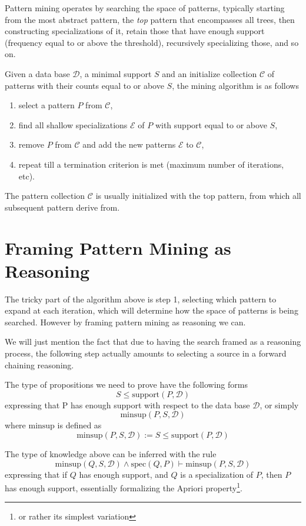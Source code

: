\documentclass[runningheads]{llncs}
\begin{document}
Pattern mining operates by searching the space of patterns, typically
starting from the most abstract pattern, the \emph{top} pattern that
encompasses all trees, then constructing specializations of it, retain
those that have enough support (frequency equal to or above the
threshold), recursively specializing those, and so on.

Given a data base $\mathcal{D}$, a minimal support $S$ and an initialize
collection $\mathcal{C}$ of patterns with their counts equal to or above $S$,
the mining algorithm is as follows
\begin{enumerate}
\item select a pattern $P$ from $\mathcal{C}$,
\item find all shallow specializations $\mathcal{E}$ of $P$ with
  support equal to or above $S$,
\item remove $P$ from $\mathcal{C}$ and add the new patterns
  $\mathcal{E}$ to $\mathcal{C}$,
\item repeat till a termination criterion is met (maximum number of
  iterations, etc).
\end{enumerate}

The pattern collection $\mathcal{C}$ is usually initialized with the
top pattern, from which all subsequent pattern derive from.

\section{Framing Pattern Mining as Reasoning}

The tricky part of the algorithm above is step 1, selecting which
pattern to expand at each iteration, which will determine how the
space of patterns is being searched. However by framing pattern mining
as reasoning we can.

We will just mention the fact that due to having the search framed as
a reasoning process, the following step actually amounts to selecting
a source in a forward chaining reasoning.

The type of propositions we need to prove have the following forms
$$ S \le \text{support}(P, \mathcal{D}) $$ expressing that P has
enough support with respect to the data base $\mathcal{D}$, or simply
$$ \text{minsup}(P, S, \mathcal{D}) $$ where $\text{minsup}$ is
defined as
$$ \text{minsup}(P, S, \mathcal{D}) := S \le \text{support}(P,
\mathcal{D}) $$

The type of knowledge above can be inferred with the rule
$$ \text{minsup}(Q, S, \mathcal{D}) \land \text{spec}(Q, P) \vdash
\text{minsup}(P, S, \mathcal{D})$$ expressing that if $Q$ has enough
support, and $Q$ is a specialization of $P$, then $P$ has enough
support, essentially formalizing the Apriori property\footnote{or
  rather its simplest variation}.
\end{document}
